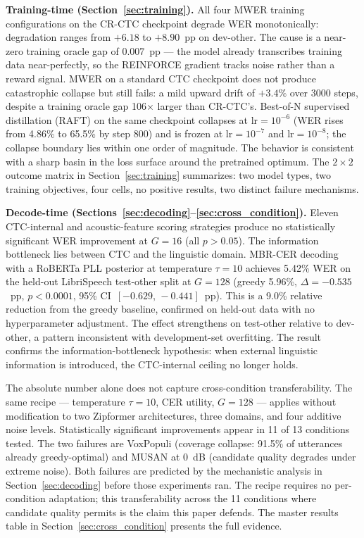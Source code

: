\textbf{Training-time (Section~\ref{sec:training}).} All four MWER training configurations on the CR-CTC checkpoint degrade WER monotonically: degradation ranges from $+6.18$ to $+8.90$~pp on dev-other. The cause is a near-zero training oracle gap of 0.007~pp — the model already transcribes training data near-perfectly, so the REINFORCE gradient tracks noise rather than a reward signal. MWER on a standard CTC checkpoint does not produce catastrophic collapse but still fails: a mild upward drift of $+3.4\%$ over 3000 steps, despite a training oracle gap 106$\times$ larger than CR-CTC's. Best-of-N supervised distillation (RAFT) on the same checkpoint collapses at lr$=10^{-6}$ (WER rises from 4.86\% to 65.5\% by step 800) and is frozen at lr$=10^{-7}$ and lr$=10^{-8}$; the collapse boundary lies within one order of magnitude. The behavior is consistent with a sharp basin in the loss surface around the pretrained optimum. The $2\times2$ outcome matrix in Section~\ref{sec:training} summarizes: two model types, two training objectives, four cells, no positive results, two distinct failure mechanisms.

\textbf{Decode-time (Sections~\ref{sec:decoding}–\ref{sec:cross_condition}).} Eleven CTC-internal and acoustic-feature scoring strategies produce no statistically significant WER improvement at $G=16$ (all $p > 0.05$). The information bottleneck lies between CTC and the linguistic domain. MBR-CER decoding with a RoBERTa PLL posterior at temperature $\tau=10$ achieves 5.42\% WER on the held-out LibriSpeech test-other split at $G=128$ (greedy 5.96\%, $\Delta=-0.535$~pp, $p < 0.0001$, 95\% CI~$[-0.629,\,-0.441]$~pp). This is a 9.0\% relative reduction from the greedy baseline, confirmed on held-out data with no hyperparameter adjustment. The effect strengthens on test-other relative to dev-other, a pattern inconsistent with development-set overfitting. The result confirms the information-bottleneck hypothesis: when external linguistic information is introduced, the CTC-internal ceiling no longer holds.

The absolute number alone does not capture cross-condition transferability. The same recipe — temperature $\tau=10$, CER utility, $G=128$ — applies without modification to two Zipformer architectures, three domains, and four additive noise levels. Statistically significant improvements appear in 11 of 13 conditions tested. The two failures are VoxPopuli (coverage collapse: 91.5\% of utterances already greedy-optimal) and MUSAN at 0~dB (candidate quality degrades under extreme noise). Both failures are predicted by the mechanistic analysis in Section~\ref{sec:decoding} before those experiments ran. The recipe requires no per-condition adaptation; this transferability across the 11 conditions where candidate quality permits is the claim this paper defends. The master results table in Section~\ref{sec:cross_condition} presents the full evidence.



